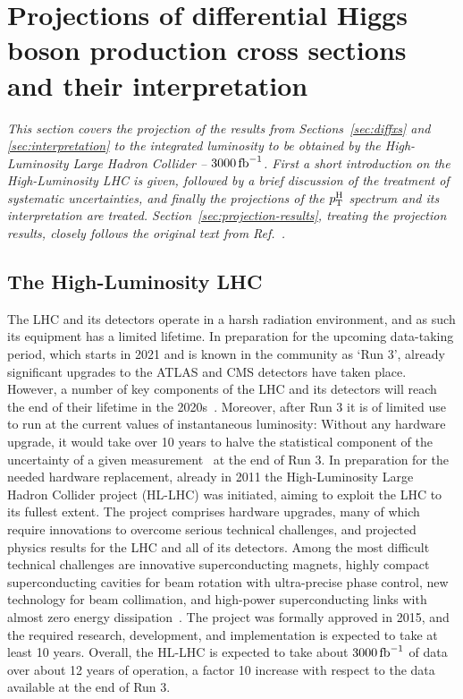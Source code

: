 \section{Projections of differential Higgs boson production cross sections and their interpretation}
\label{sec:projections}

\emph{%
This section covers the projection of the results from Sections~\ref{sec:diffxs} and \ref{sec:interpretation} to the integrated luminosity to be obtained by the High-Luminosity Large Hadron Collider -- $3000\,\text{fb}^{-1}$.
% 
First a short introduction on the High-Luminosity LHC is given, followed by a brief discussion of the treatment of systematic uncertainties, and finally the projections of the $p_\mathrm{T}^\mathrm{H}$ spectrum and its interpretation are treated.
% 
Section~\ref{sec:projection-results}, treating the projection results, closely follows the original text from Ref.~\cite{CMS:2018qgz}.
}


\subsection{The High-Luminosity LHC}

The LHC and its detectors operate in a harsh radiation environment, and as such its equipment has a limited lifetime.
% 
In preparation for the upcoming data-taking period, which starts in 2021 and is known in the community as `Run 3', already significant upgrades to the ATLAS and CMS detectors have taken place.
% 
However, a number of key components of the LHC and its detectors will reach the end of their lifetime in the 2020s~\cite{hllhc}.
% 
Moreover, after Run 3 it is of limited use to run at the current values of instantaneous luminosity: Without any hardware upgrade, it would take over 10 years to halve the statistical component of the uncertainty of a given measurement~\cite{hllhc} at the end of Run 3.
% 
In preparation for the needed hardware replacement, already in 2011 the High-Luminosity Large Hadron Collider project (HL-LHC) was initiated, aiming to exploit the LHC to its fullest extent.
% 
The project comprises hardware upgrades, many of which require innovations to overcome serious technical challenges, and projected physics results for the LHC and all of its detectors.
% 
Among the most difficult technical challenges are innovative superconducting magnets, highly compact superconducting cavities for beam rotation with ultra-precise phase control, new technology for beam collimation, and high-power superconducting links with almost zero energy dissipation~\cite{hllhc}.
% 
The project was formally approved in 2015, and the required research, development, and implementation is expected to take at least 10 years.
% 
Overall, the HL-LHC is expected to take about $3000\,\text{fb}^{-1}$ of data over about 12 years of operation, a factor 10 increase with respect to the data available at the end of Run 3.


